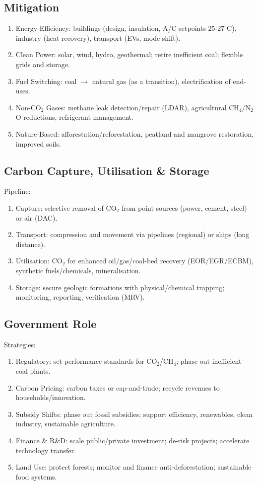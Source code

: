 \documentclass[12pt, a4paper]{article}
\begin{document}
\begin{multicols*}{3}
\subsection{Mitigation}
\begin{enumerate}[\roman*.]
  \item Energy Efficiency: buildings (design, insulation, A/C setpoints $25$-$27^{\circ}$C), industry (heat recovery), transport (EVs, mode shift).
  \item Clean Power: solar, wind, hydro, geothermal; retire inefficient coal; flexible grids and storage.
  \item Fuel Switching: coal $\rightarrow$ natural gas (as a transition), electrification of end-uses.
  \item Non-CO$_2$ Gases: methane leak detection/repair (LDAR), agricultural CH$_4$/N$_2$O reductions, refrigerant management.
  \item Nature-Based: afforestation/reforestation, peatland and mangrove restoration, improved soils.
\end{enumerate}
\vspace{-1em}
\colbreak

\subsection{Carbon Capture, Utilisation \& Storage}
Pipeline:
\begin{enumerate}[\roman*.]
  \item Capture: selective removal of CO$_2$ from point sources (power, cement, steel) or air (DAC).
  \item Transport: compression and movement via pipelines (regional) or ships (long distance).
  \item Utilisation: CO$_2$ for enhanced oil/gas/coal-bed recovery (EOR/EGR/ECBM), synthetic fuels/chemicals, mineralisation.
  \item Storage: secure geologic formations with physical/chemical trapping; monitoring, reporting, verification (MRV).
\end{enumerate}

\subsection{Government Role}
Strategies:
\begin{enumerate}[\roman*.]
  \item Regulatory: set performance standards for CO$_2$/CH$_4$; phase out inefficient coal plants.
  \item Carbon Pricing: carbon taxes or cap-and-trade; recycle revenues to households/innovation.
  \item Subsidy Shifts: phase out fossil subsidies; support efficiency, renewables, clean industry, sustainable agriculture.
  \item Finance \& R\&D: scale public/private investment; de-risk projects; accelerate technology transfer.
  \item Land Use: protect forests; monitor and finance anti-deforestation; sustainable food systems.
\end{enumerate}


\end{multicols*}
\end{document}
